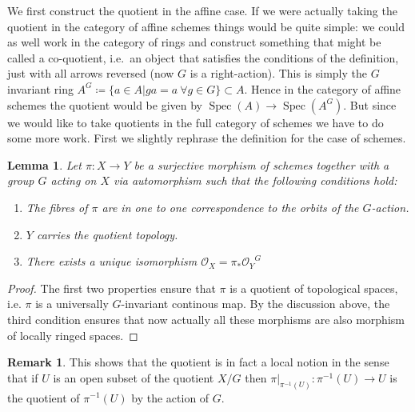 \documentclass[11pt, a4paper, german]{article}
\theoremstyle{plain}
\newtheorem{lemma}[theorem]{Lemma}
\theoremstyle{definition}
\newtheorem{remark}[theorem]{Remark}
\DeclareMathOperator{\Spec}{Spec}
\begin{document}
We first construct the quotient in the affine case. If we were actually taking the quotient in the category of affine schemes things would be
quite simple: we could as well work in the category of rings and construct something that might be called a co-quotient, i.e.\ an object that
satisfies the conditions of the definition, just with all arrows reversed (now $G$ is a right-action). This is simply the $G$ invariant ring
$A^G \coloneqq \{a \in A | ga = a \ \forall g \in G\} \subset A$. Hence in the category of affine schemes the quotient would be given by 
$\Spec(A) \to \Spec(A^G)$. But since we would like to take quotients in the full category of schemes we have to do some more work.
First we slightly rephrase the definition for the case of schemes.
\begin{lemma}
    \label{quotProps}
    Let $\pi \colon X \to Y$ be a surjective morphism of schemes together with a group $G$ acting on $X$ via automorphism 
    such that the following conditions hold:
    \begin{enumerate}[label=\rm{\roman*)}]
        \item The fibres of $\pi$ are in one to one correspondence to the orbits of the $G$-action.
        \item $Y$ carries the quotient topology.
        \item There exists a unique isomorphism $\mathcal{O}_X = {\pi_*\mathcal{O}_Y}^G$
    \end{enumerate}
\end{lemma}
\begin{proof}
    The first two properties ensure that $\pi$ is a quotient of topological spaces, i.e. $\pi$ is a universally $G$-invariant continous map.
    By the discussion above, the third condition ensures that now actually all these morphisms are also morphism of locally ringed spaces.
\end{proof}

\begin{remark}
    \label{quotLocal}
    This shows that the quotient is in fact a local notion in the sense that if $U$ is an open subset of the quotient $X/G$ 
    then $\pi|_{\pi^{-1}(U)} \colon \pi^{-1}(U) \to U$ is the quotient of $\pi^{-1}(U)$ by the action of $G$.
\end{remark}
\end{document}
